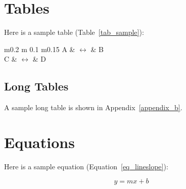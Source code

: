 \section{Tables}

Here is a sample table (Table~\ref{tab_sample}):

	\begin{table}[ht]
	\centering
	\begin{tabular}{ m{} m {0.1\textwidth} m{0.15\textwidth} }
		\toprule
		A & $\longleftrightarrow$ & B \\
		C & $\longleftrightarrow$ & D \\
		\bottomrule	
	\end{tabular}	
	\caption{A sample table}	
	\label{tab_sample}
\end{table}

\subsection{Long Tables}
A sample long table is shown in Appendix~\ref{appendix_b}.

\section{Equations}

Here is a sample equation (Equation~\ref{eq_lineslope}):

\begin{equation} \label{eq_lineslope}
	y = mx + b
\end{equation}